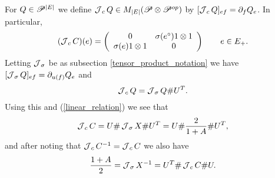 For $Q\in \P^{|E|}$ we define $\J_c Q \in M_{|E|}(\P\otimes\P^{op})$ by $[\J_c Q]_{ef}=\partial_f Q_e$. In particular,
\begin{align}\label{derivative_of_C}
(\J_c C)(e) = \left(
\begin{array}{cc}
0	&	\sigma(e^\circ)1\otimes 1\\
\sigma(e)1\otimes 1	&	0
\end{array}
\right)\qquad e\in E_+.
\end{align}
Letting $\J_\sigma$ be as subsection \ref{tensor_product_notation} we have $[\J_\sigma Q]_{ef}=\partial_{u(f)}Q_e$ and
	\begin{align}\label{linear_relation_derivative1}
		\J_c Q=\J_\sigma Q\# U^{T}.
	\end{align}
Using this and (\ref{linear_relation}) we see that
	\begin{align}\label{linear_relation2}
		\J_c C = U \# \J_\sigma X \# U^T = U\# \frac{2}{1+A} \# U^T,			
	\end{align}
and after noting that $\J_c C^{-1}= \J_c C$ we also have
	\begin{align}\label{linear_relation3}
		\frac{1+A}{2}=\J_\sigma X^{-1} = U^T\# \J_c C\# U.
	\end{align}


